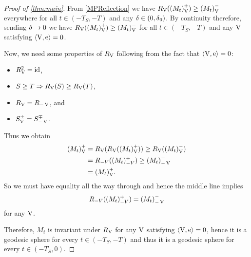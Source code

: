\documentclass{amsart}
\begin{document}
\begin{proof}[Proof of \cref{thm:main}]
From \cref{MPReflection} we have \(\reflectionmap(\reflectionset{(M_t)}^+) \geq \reflectionset{(M_t)}^-\) everywhere for all \(t \in (-T_S, -T)\) and any \(\reflectionangle \in (0,\reflectionangle_0)\). By continuity therefore, sending \(\reflectionangle \to 0\) we have \(\reflectionmap(\reflectionset{(M_t)}^+) \geq \reflectionset{(M_t)}^-\) for all \(t \in (-T_S, -T)\)  and any \(\reflectionvector\) satisfying \(\ip{\reflectionvector}{\vertvec} = 0\).

Now, we need some properties of $\reflectionmap[\reflectionvector]$ following from the fact that $\ip{\reflectionvector}{\vertvec} = 0$:
\begin{itemize}
\item $\reflectionmap^2 = \id$,
\item $S \geq T \Rightarrow \reflectionmap(S) \geq  \reflectionmap(T)$,
\item $\reflectionmap = \reflectionmap[-\reflectionvector]$, and
\item $\reflectionset{S}^{\pm} = \reflectionset[-\reflectionvector]{S}^{\mp}$.
\end{itemize}
Thus we obtain
\begin{align*}
\reflectionset{(M_t)}^+ &= \reflectionmap(\reflectionmap(\reflectionset{(M_t)}^+)) \geq \reflectionmap(\reflectionset{(M_t)}^-) \\
&= R_{-V}((M_t)^+_{-V}) \geq \reflectionset[-\reflectionvector]{(M_t)}^-\\
&= \reflectionset{(M_t)}^+.
\end{align*}
So we must have equality all the way through and hence the middle line implies
\[
R_{-V}((M_t)^+_{-V}) = \reflectionset[-\reflectionvector]{(M_t)}^-
\]
for any $\reflectionvector$.

Therefore, \(M_t\) is invariant under \(\reflectionmap\) for any \(\reflectionvector\) satisfying \(\ip{\reflectionvector}{\vertvec} = 0\), hence it is a geodesic sphere for every \(t \in (-T_S, -T)\) and thus it is a geodesic sphere for every \(t \in (-T_S, 0)\).
\end{proof}
\end{document}

